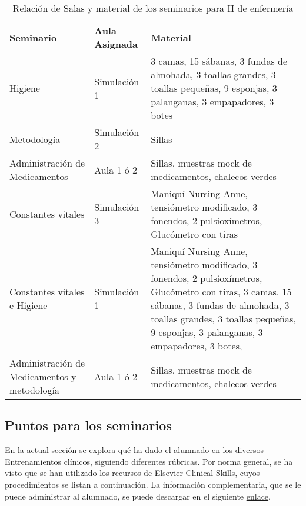 \begin{table}[H]
    \centering
    \begin{tabular}{N{0.2\textwidth}N{0.12\textwidth}M{0.6\textwidth}}
        {\color[HTML]{FFFFFF} \textbf{Seminario}} &
          {\color[HTML]{FFFFFF} \textbf{Aula Asignada}} &
          {\color[HTML]{FFFFFF} \textbf{Material}} \\
        Higiene &
          Simulación 1 &
          3 camas, 15 sábanas, 3 fundas de almohada, 3 toallas grandes, 3 toallas pequeñas, 9 esponjas, 3 palanganas, 3 empapadores, 3 botes \\
        Metodología &
          Simulación 2 &
          Sillas \\
        Administración de Medicamentos &
          Aula 1 ó 2 &
          Sillas, muestras mock de medicamentos, chalecos verdes \\
        Constantes vitales &
          Simulación 3 &
          Maniquí Nursing Anne, tensiómetro modificado, 3 fonendos, 2 pulsioxímetros, Glucómetro con tiras \\ \hline
        Constantes vitales e Higiene &
          Simulación 1 &
          Maniquí Nursing Anne, tensiómetro modificado, 3 fonendos, 2 pulsioxímetros, Glucómetro con tiras, 3 camas, 15 sábanas, 3 fundas de almohada, 3 toallas grandes, 3 toallas pequeñas, 9 esponjas, 3 palanganas, 3 empapadores, 3 botes, \\
        Administración de Medicamentos y metodología &
          Aula 1 ó 2 &
          Sillas, muestras mock de medicamentos, chalecos verdes\\
          \hline
    \end{tabular}
    \caption{Relación de Salas y material de los seminarios para II de enfermería}
    \label{tab:PlanXVII:SalasEstaciones}
\end{table}
\subsection{Puntos para los seminarios}
En la actual sección se explora qué ha dado el alumnado en los diversos Entrenamientos clínicos, siguiendo diferentes rúbricas. Por norma general, se ha visto que se han utilizado los recursos de \href{https://www.elsevierclinicalskills.es/default.aspx?language=es-ES}{Elsevier Clinical Skills}, cuyos procedimientos se listan a continuación. La información complementaria, que se le puede administrar al alumnado, se puede descargar en el siguiente \href{https://drive.google.com/file/d/1CTaDmnLv9YycqY9U1S\_Ulf5biwCYtIKD/view?usp=sharing}{enlace}.
